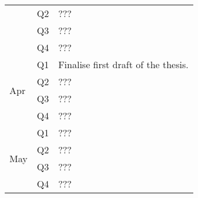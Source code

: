 \documentclass{article}
\begin{document}
\begin{table}[]
\begin{tabular}{lll}
                     & Q2  & ??? \\
                     & Q3  & ??? \\
                     & Q4  & ??? \\ \hline
\multirow{4}{*}{Apr} & Q1  & Finalise first draft of the thesis. \\
                     & Q2  & ??? \\
                     & Q3  & ??? \\
                     & Q4  & ??? \\ \hline
\multirow{4}{*}{May} & Q1  & ??? \\
                     & Q2  & ??? \\
                     & Q3  & ??? \\
                     & Q4  & ???
\end{tabular}
\end{table}

\newpage


\end{document}
